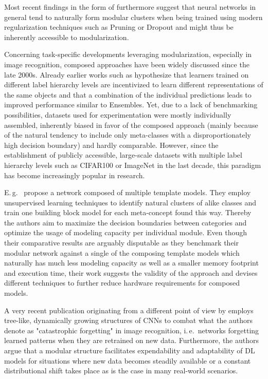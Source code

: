 Most recent findings in the form of \cite{Filan2020-nx} furthermore suggest that neural networks in general tend to naturally form modular clusters when being trained using modern regularization techniques such as Pruning or Dropout and might thus be inherently accessible to modularization.

Concerning task-specific developments leveraging modularization, especially in image recognition, composed approaches have been widely discussed since the late 2000s. Already earlier works such as \cite{Zweig2007-oo} hypothesize that learners trained on different label hierarchy levels are incentivized to learn different representations of the same objects and that a combination of the individual predictions leads to improved performance similar to Ensembles. Yet, due to a lack of benchmarking possibilities, datasets used for experimentation were mostly individually assembled, inherently biased in favor of the composed approach (mainly because of the natural tendency to include only meta-classes with a disproportionately high decision boundary) and hardly comparable. However, since the establishment of publicly accessible, large-scale datasets with multiple label hierarchy levels such as CIFAR100 or ImageNet in the last decade, this paradigm has become increasingly popular in research.

E.\,g.\ \cite{Yan2015-go} propose a network composed of multiple template models. They employ unsupervised learning techniques to identify natural clusters of alike classes and train one building block model for each meta-concept found this way. Thereby the authors aim to maximize the decision boundaries between categories and optimize the usage of modeling capacity per individual module. Even though their comparative results are arguably disputable as they benchmark their modular network against a single of the composing template models which naturally has much less modeling capacity as well as a smaller memory footprint and execution time, their work suggests the validity of the approach and devises different techniques to further reduce hardware requirements for composed models.

A very recent publication originating from a different point of view by \cite{Roy2020-rv} employs tree-like, dynamically growing structures of CNNs to combat what the authors denote as "catastrophic forgetting" in image recognition, i.\,e.\ networks forgetting learned patterns when they are retrained on new data. Furthermore, the authors argue that a modular structure facilitates expendability and adaptability of DL models for situations where new data becomes steadily available or a constant distributional shift takes place as is the case in many real-world scenarios.

